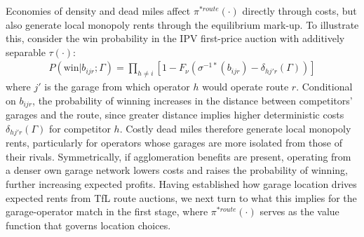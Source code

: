 \documentclass[12pt]{article}
\begin{document}
Economies of density and dead miles affect $\pi^{*route}(\cdot)$ directly through 
costs, but also generate local monopoly rents through the equilibrium mark-up. 
To illustrate this, consider the win probability in the IPV first-price auction 
with additively separable $\tau(\cdot)$:
\begin{align}\label{eq:strucvalue1}
P(\text{win}|b_{ijr};\Gamma) = \prod_{h\neq i} 
\left[1 - F_{\nu}\!\left(\sigma^{-1*}(b_{ijr})-\delta_{hj'r}(\Gamma)\right)\right]
\end{align}
where $j'$ is the garage from which operator $h$ would operate route $r$. 
Conditional on $b_{ijr}$, the probability of winning increases in the distance 
between competitors' garages and the route, since greater distance implies 
higher deterministic costs $\delta_{hj'r}(\Gamma)$ for competitor $h$. Costly 
dead miles therefore generate local monopoly rents, particularly for operators 
whose garages are more isolated from those of their rivals. Symmetrically, if 
agglomeration benefits are present, operating from a denser own garage network 
lowers costs and raises the probability of winning, further increasing expected 
profits. Having established how garage location drives expected rents from TfL 
route auctions, we next turn to what this implies for the garage-operator match 
in the first stage, where $\pi^{*route}(\cdot)$ serves as the value function that 
governs location choices.


\end{document}
